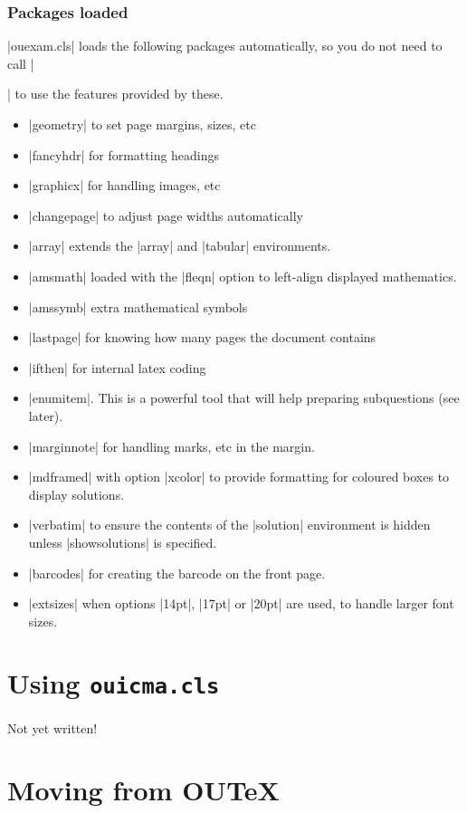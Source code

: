 \documentclass[a4paper]{ltxguide}
\newcommand\3{\unskip\enspace\fbox{\fontsize{4}{4}\selectfont NEW 3.0}}
\begin{document}
\subsubsection{Packages loaded}
|ouexam.cls| loads the following packages automatically, so you do not need to call |\usepackage{...}| to use the features provided by these.

\begin{itemize}
\item |geometry| to set page margins, sizes, etc
\item |fancyhdr| for formatting headings
\item |graphicx| for handling images, etc
\item |changepage| to adjust page widths automatically
\item |array| extends the |array| and |tabular| environments.
\item |amsmath| loaded with the |fleqn| option to left-align displayed mathematics.
\item |amssymb| extra mathematical symbols
\item |lastpage| for knowing how many pages the document contains
\item |ifthen| for internal latex coding
\item |enumitem|. This is a powerful tool that will help preparing subquestions (see later).
\item |marginnote| for handling marks, etc in the margin.
\item |mdframed| with option |xcolor| to provide formatting for coloured boxes to display solutions.
\item |verbatim| to ensure the contents of the |solution| environment is hidden unless |showsolutions| is specified.
\item |barcodes| for creating the barcode on the front page. 
\item |extsizes| when options |14pt|, |17pt| or |20pt| are used, to handle larger font sizes. 
\end{itemize}

%
%
%
%
%
%
%
%
%
%
\section{Using \texttt{ouicma.cls}}
Not yet written!

%
%
%
%
%
%
%
%
%
%
\section{Moving from OUTeX}
\end{document}
